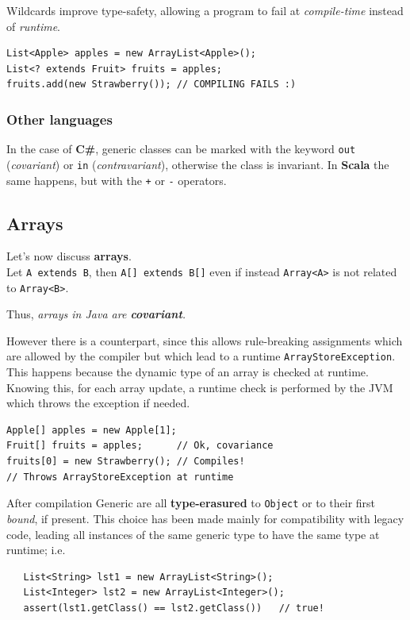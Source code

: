 Wildcards improve type-safety, allowing a program to fail at \textit{compile-time} instead of \textit{runtime}.
\begin{lstlisting}
List<Apple> apples = new ArrayList<Apple>();
List<? extends Fruit> fruits = apples;
fruits.add(new Strawberry()); // COMPILING FAILS :)
\end{lstlisting}

\subsubsection*{Other languages}
In the case of \textbf{C\#}, generic classes can be marked with the keyword \lstinline|out| (\textit{covariant}) or \lstinline|in| (\textit{contravariant}),
otherwise the class is invariant.
In \textbf{Scala} the same happens,
but with the \lstinline|+| or \lstinline|-| operators.\nl

\subsection{Arrays}
Let's now discuss \textbf{arrays}.\\
Let \lstinline|A extends B|, then \lstinline|A[] extends B[]| even if instead \lstinline|Array<A>| is not related to \lstinline|Array<B>|.
\begin{center}
   Thus, \textit{arrays in Java are \textbf{covariant}.}
\end{center}

However there is a counterpart, since this allows rule-breaking assignments
which are allowed by the compiler but which lead to a runtime \lstinline|ArrayStoreException|.
This happens because the dynamic type of an array is checked at runtime.
Knowing this, for each array update, a runtime check is performed by the JVM which throws the exception if needed.
\begin{lstlisting}
Apple[] apples = new Apple[1];
Fruit[] fruits = apples;      // Ok, covariance
fruits[0] = new Strawberry(); // Compiles!
// Throws ArrayStoreException at runtime
\end{lstlisting}

After compilation Generic are all \textbf{type-erasured} to \lstinline|Object| or to their first \textit{bound}, if present.
This choice has been made mainly for compatibility with legacy code, leading all instances of the same generic type to have the same type at runtime; 
i.e.
\begin{lstlisting}
   List<String> lst1 = new ArrayList<String>();
   List<Integer> lst2 = new ArrayList<Integer>();
   assert(lst1.getClass() == lst2.getClass())   // true!
\end{lstlisting}

